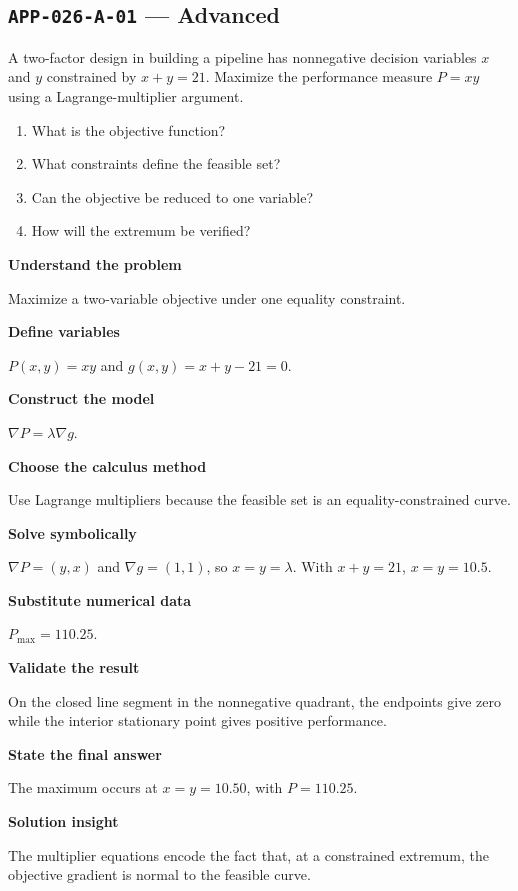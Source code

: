 \documentclass[11pt]{book}
\newcommand{\pid}[1]{\texttt{#1}}
\begin{document}
\subsection*{\pid{APP-026-A-01} — Advanced}
\begin{problembox}
A two-factor design in building a pipeline has nonnegative decision variables $x$ and $y$ constrained by $x+y=21$. Maximize the performance measure $P=xy$ using a Lagrange-multiplier argument.
\end{problembox}
\begin{promptbox}\begin{enumerate}
\item What is the objective function?
\item What constraints define the feasible set?
\item Can the objective be reduced to one variable?
\item How will the extremum be verified?
\end{enumerate}\end{promptbox}
\begin{solutionbox}
\textbf{Understand the problem}\par Maximize a two-variable objective under one equality constraint.\par\medskip
\textbf{Define variables}\par $P(x,y)=xy$ and $g(x,y)=x+y-21=0$.\par\medskip
\textbf{Construct the model}\par $\nabla P=\lambda\nabla g$.\par\medskip
\textbf{Choose the calculus method}\par Use Lagrange multipliers because the feasible set is an equality-constrained curve.\par\medskip
\textbf{Solve symbolically}\par $\nabla P=(y,x)$ and $\nabla g=(1,1)$, so $x=y=\lambda$. With $x+y=21$, $x=y=10.5$.\par\medskip
\textbf{Substitute numerical data}\par $P_{\max}=110.25$.\par\medskip
\textbf{Validate the result}\par On the closed line segment in the nonnegative quadrant, the endpoints give zero while the interior stationary point gives positive performance.\par\medskip
\textbf{State the final answer}\par The maximum occurs at $x=y=10.50$, with $P=110.25$.\par\medskip
\textbf{Solution insight}\par The multiplier equations encode the fact that, at a constrained extremum, the objective gradient is normal to the feasible curve.\par\medskip
\end{solutionbox}
\end{document}
